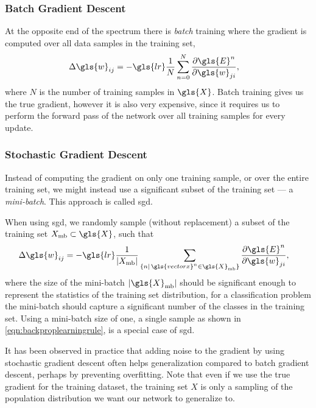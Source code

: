\documentclass[thesis]{subfiles}
\begin{document}
\subsubsection{Batch Gradient Descent}
At the opposite end of the spectrum there is \emph{batch} training where the gradient is computed over all data samples in the training set,
\begin{equation}
\begin{aligned}
    \Delta \gls{w}_{ij} &= -\gls{lr}\frac{1}{N} \sum^N_{n=0} \frac{\partial \gls{E}^n}{\partial \gls{w}_{ji}},
     \label{eqn:batchlearningrule}
\end{aligned}
\end{equation}
%
where $N$ is the number of training samples in $\gls{X}$. Batch training gives us the true gradient, however it is also very expensive, since it requires us to perform the forward pass of the network over all training samples for every update. 

\subsubsection{Stochastic Gradient Descent}
Instead of computing the gradient on only one training sample, or over the entire training set, we might instead use a significant subset of the training set --- a \emph{mini-batch}. This approach is called \gls{sgd}.

When using \gls{sgd}, we randomly sample (without replacement) a subset of the training set $X_{\textrm{mb}} \subset \gls{X}$, such that
\begin{equation}
\begin{aligned}
    \Delta \gls{w}_{ij} &= -\gls{lr} \frac{1}{|X_{\textrm{mb}}|} \sum_{\{n|\,\gls{vectorx}^n \in \gls{X}_{\textrm{mb}}\}} \frac{\partial \gls{E}^n}{\partial \gls{w}_{ji}},
     \label{eqn:sgdrule}
\end{aligned}
\end{equation}
where the size of the mini-batch $|\gls{X}_{\textrm{mb}}|$ should be significant enough to represent the statistics of the training set distribution, \ie for a classification problem the mini-batch should capture a significant number of the classes in the training set. Using a mini-batch size of one, \ie a single sample as shown in \cref{eqn:backproplearningrule}, is a special case of \gls{sgd}. 

It has been observed in practice that adding noise to the gradient by using stochastic gradient descent often helps generalization compared to batch gradient descent, perhaps by preventing overfitting. Note that even if we use the true gradient for the training dataset, the training set $X$ is only a sampling of the population distribution we want our network to generalize to.
\end{document}
